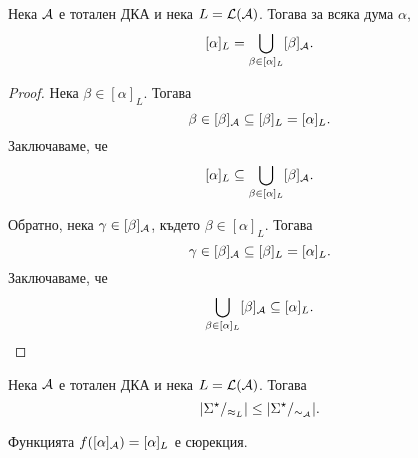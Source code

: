 \begin{prop}
  Нека $\mathcal{A}$ е тотален ДКА и нека $L = \mathcal{L}(\mathcal{A})$.
  Тогава за всяка дума $\alpha$,
  \[[\alpha]_{L} = \bigcup_{\beta \in [\alpha]_{L}}[\beta]_{\mathcal{A}}.\]
\end{prop}
\begin{proof}
  Нека $\beta \in [\alpha]_L$. Тогава 
  \[\beta \in [\beta]_{\mathcal{A}} \subseteq [\beta]_L = [\alpha]_L.\]
  Заключаваме, че
  \[[\alpha]_L \subseteq \bigcup_{\beta \in [\alpha]_{L}}[\beta]_{\mathcal{A}}.\]

  Обратно, нека $\gamma \in [\beta]_{\mathcal{A}}$, където $\beta \in [\alpha]_L$.
  Тогава 
  \[\gamma \in [\beta]_{\mathcal{A}} \subseteq [\beta]_L = [\alpha]_L.\]
  Заключаваме, че
  \[\bigcup_{\beta \in [\alpha]_{L}}[\beta]_{\mathcal{A}} \subseteq [\alpha]_L.\]
\end{proof}


\begin{cor}
  \label{cor:approx-less-sim}
  Нека $\mathcal{A}$ е тотален ДКА и нека $L = \mathcal{L}(\mathcal{A})$.
  Тогава 
  \[\vert{\Sigma^\star/_{\approx_{L}}}\vert \leq \vert{\Sigma^\star/_{\sim_{\mathcal{A}}}}\vert.\]
\end{cor}
\begin{hint}
  Функцията $f([\alpha]_{\mathcal{A}}) = [\alpha]_L$ е сюрекция.
\end{hint}


